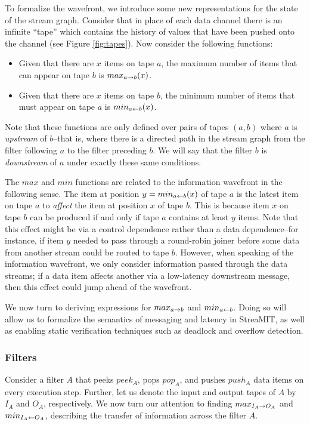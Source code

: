 To formalize the wavefront, we introduce some new representations for
the state of the stream graph.  Consider that in place of each data
channel there is an infinite ``tape'' which contains the history of
values that have been pushed onto the channel (see Figure
\ref{fig:tapes}).  Now consider the following functions:
\begin{itemize}
\item Given that there are $x$ items on tape $a$, the maximum number
of items that can appear on tape $b$ is $max_{a \rightarrow b}(x)$.

\item Given that there are $x$ items on tape $b$, the minimum number
of items that must appear on tape $a$ is $min_{a \leftarrow b}(x)$.
\end{itemize}
Note that these functions are only defined over pairs of tapes $(a,
b)$ where $a$ is {\it upstream} of $b$--that is, where there is a
directed path in the stream graph from the filter following $a$ to the
filter preceding $b$.  We will say that the filter $b$ is {\it
downstream} of $a$ under exactly these same conditions.

The $max$ and $min$ functions are related to the information wavefront
in the following sense.  The item at position $y = min_{a \leftarrow b}(x)$ of
tape $a$ is the latest item on tape $a$ to {\it affect} the item at
position $x$ of tape $b$.  This is because item $x$ on tape $b$ can be
produced if and only if tape $a$ contains at least $y$ items.  Note
that this effect might be via a control dependence rather than a data
dependence--for instance, if item $y$ needed to pass through a
round-robin joiner before some data from another stream could be
routed to tape $b$.  However, when speaking of the information
wavefront, we only consider information passed through the data
streams; if a data item affects another via a low-latency downstream
message, then this effect could jump ahead of the wavefront.

We now turn to deriving expressions for $max_{a \rightarrow b}$ and $min_{a \leftarrow b}$.
Doing so will allow us to formalize the semantics of messaging and
latency in StreaMIT, as well as enabling static verification
techniques such as deadlock and overflow detection.

\subsubsection{Filters}

Consider a filter $A$ that peeks $peek_A$, pops $pop_A$, and pushes
$push_A$ data items on every execution step.  Further, let us denote
the input and output tapes of $A$ by $I_A$ and $O_A$, respectively.
We now turn our attention to finding $max_{I_A \rightarrow O_A}$ and
$min_{I_A \leftarrow O_A}$, describing the transfer of information across the
filter $A$.


